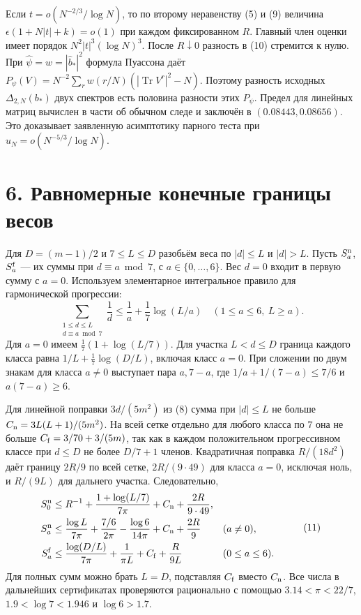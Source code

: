 \documentclass[11pt,a4paper]{article}
\newcommand{\Tr}{\operatorname{Tr}}
\newcommand{\sect}[1]{\section*{\sffamily\color{ink}#1}}
\begin{document}
Если \(t=o(N^{-2/3}/\log N)\), то по второму неравенству (5) и (9) величина \(\epsilon(1+N|t|+k)=o(1)\) при каждом фиксированном \(R\). Главный член оценки имеет порядок \(N^2|t|^3(\log N)^3\). После \(R\downarrow0\) разность в (10) стремится к нулю. При \(\widehat\psi=w=|\widehat b_*|^2\) формула Пуассона даёт \(P_\psi(V)=N^{-2}\sum_r w(r/N)(|\Tr V^r|^2-N)\). Поэтому разность исходных \(\Delta_{2,N}(b_*)\) двух спектров есть половина разности этих \(P_\psi\). Предел для линейных матриц вычислен в части об обычном следе и заключён в \((0.08443,0.08656)\). Это доказывает заявленную асимптотику парного теста при \(u_N=o(N^{-5/3}/\log N)\).
\newpage
\sect{6. Равномерные конечные границы весов}
Для \(D=(m-1)/2\) и \(7\le L\le D\) разобьём веса по \(|d|\le L\) и \(|d|>L\). Пусть \(S_a^{\rm n}\), \(S_a^{\rm f}\) --- их суммы при \(d\equiv a\bmod7\), с \(a\in\{0,\ldots,6\}\). Вес \(d=0\) входит в первую сумму с \(a=0\). Используем элементарное интегральное правило для гармонической прогрессии:
\[
\sum_{\substack{1\le d\le L\\d\equiv a\bmod7}}\frac1d
   \le \frac1a+\frac17\log(L/a)\quad(1\le a\le6,\ L\ge a).
\]
Для \(a=0\) имеем \(\frac17(1+\log(L/7))\). Для участка \(L<d\le D\) граница каждого класса равна \(1/L+\frac17\log(D/L)\), включая класс \(a=0\). При сложении по двум знакам для класса \(a\ne0\) выступает пара \(a,7-a\), где \(1/a+1/(7-a)\le7/6\) и \(a(7-a)\ge6\).

Для линейной поправки \(3d/(5m^2)\) из (8) сумма при \(|d|\le L\) не больше
\(C_{\rm n}=3L(L+1)/(5m^2)\). На всей сетке отдельно для любого класса по \(7\) она не больше \(C_{\rm f}=3/70+3/(5m)\), так как в каждом положительном прогрессивном классе при \(d\le D\) не более \(D/7+1\) членов. Квадратичная поправка \(R/(18d^2)\) даёт границу \(2R/9\) по всей сетке, \(2R/(9\cdot49)\) для класса \(a=0\), исключая ноль, и \(R/(9L)\) для дальнего участка. Следовательно,
\[
\begin{aligned}
 S_0^{\rm n}&\le R^{-1}+\frac{1+\log(L/7)}{7\pi}
                         +C_{\rm n}+\frac{2R}{9\cdot49},\\
 S_a^{\rm n}&\le \frac{\log L}{7\pi}+\frac{7/6}{2\pi}
                       -\frac{\log6}{14\pi}+C_{\rm n}+\frac{2R}{9}
                            &&(a\ne0),\\
 S_a^{\rm f}&\le \frac{\log(D/L)}{7\pi}+\frac1{\pi L}
                              +C_{\rm f}+\frac{R}{9L}
                            &&(0\le a\le6).
\end{aligned}                                                   \tag{11}
\]
Для полных сумм можно брать \(L=D\), подставляя \(C_{\rm f}\) вместо \(C_{\rm n}\). Все числа в дальнейших сертификатах проверяются рационально с помощью \(3.14<\pi<22/7\), \(1.9<\log7<1.946\) и \(\log6>1.7\).
\end{document}
